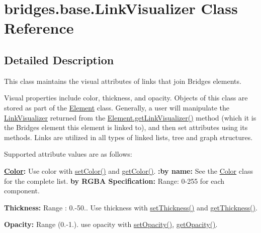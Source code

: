 \hypertarget{classbridges_1_1base_1_1_link_visualizer}{}\section{bridges.\+base.\+Link\+Visualizer Class Reference}
\label{classbridges_1_1base_1_1_link_visualizer}


\subsection{Detailed Description}
This class maintains the visual attributes of links that join Bridges elements. 

Visual properties include color, thickness, and opacity. Objects of this class are stored as part of the \mbox{\hyperlink{classbridges_1_1base_1_1_element}{Element}} class. Generally, a user will manipulate the \mbox{\hyperlink{classbridges_1_1base_1_1_link_visualizer}{Link\+Visualizer}} returned from the \mbox{\hyperlink{classbridges_1_1base_1_1_element_a7978552c7b36e28c302f611fc1958e7f}{Element.\+get\+Link\+Visualizer()}} method (which it is the Bridges element this element is linked to), and then set attributes using its methods. Links are utilized in all types of linked lists, tree and graph structures.

Supported attribute values are as follows\+:

{\bfseries \mbox{\hyperlink{classbridges_1_1base_1_1_color}{Color}}\+:} Use color with \mbox{\hyperlink{classbridges_1_1base_1_1_link_visualizer_a92f306dbd73b961befa8ab4c0620a89e}{set\+Color()}} and \mbox{\hyperlink{classbridges_1_1base_1_1_link_visualizer_a3ed52d98ecab99c6d8dd136fba913b7d}{get\+Color()}}. {\bfseries \+:by name\+:} See the \mbox{\hyperlink{classbridges_1_1base_1_1_color}{Color}} class for the complete list. {\bfseries by R\+G\+BA Specification\+:} Range\+: 0-\/255 for each component.

{\bfseries  Thickness\+: } Range \+: 0.-\/50.. Use thickness with \mbox{\hyperlink{classbridges_1_1base_1_1_link_visualizer_a702e9ca345d1a4a035baf2041f275849}{set\+Thickness()}} and \mbox{\hyperlink{classbridges_1_1base_1_1_link_visualizer_af1592d2a8664b00c1a51fdc0f8d1860a}{get\+Thickness()}}.

{\bfseries  Opacity\+: } Range (0.-\/1.). use opacity with \mbox{\hyperlink{classbridges_1_1base_1_1_link_visualizer_ac0d59614dbc65ed0a19c25c493a1deaa}{set\+Opacity()}}, \mbox{\hyperlink{classbridges_1_1base_1_1_link_visualizer_a07cdd435a54e4b612ad63614f2a27a4a}{get\+Opacity()}}.

